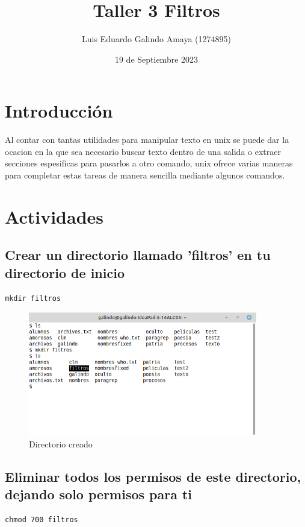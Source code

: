 \documentclass[11pt]{article}
\author{Luis Eduardo Galindo Amaya (1274895)}
\date{19 de Septiembre 2023}
\title{Taller 3 Filtros}
\begin{document}
\tableofcontents\pagebreak
{}


\section{Introducción}
\label{sec:orgc273ed6}
Al contar con tantas utilidades para manipular texto en unix se puede dar la
ocacion en la que sea necesario buscar texto dentro de una salida o extraer 
secciones espesificas para pasarlos a otro comando, unix ofrece varias 
maneras para completar estas tareas de manera sencilla mediante algunos 
comandos.

\section{Actividades}
\label{sec:orgb51ced4}
\subsection{Crear un directorio llamado 'filtros' en tu directorio de inicio}
\label{sec:orgb052335}
\begin{verbatim}
mkdir filtros
\end{verbatim}

\begin{figure}[htbp]
\centering
\includegraphics[width=10cm]{img/a1.png}
\caption{Directorio creado}
\end{figure}

\subsection{Eliminar todos los permisos de este directorio, dejando solo permisos para ti}
\label{sec:org6205695}
\begin{verbatim}
chmod 700 filtros
\end{verbatim}
\end{document}
